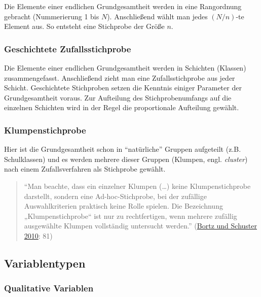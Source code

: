 \documentclass[
  11pt,
  ngerman,
  a4paper,
]{report}
\begin{document}
Die Elemente einer endlichen Grundgesamtheit werden in eine Rangordnung gebracht (Nummerierung 1 bis \(N\)). Anschließend wählt man jedes \((N/n)\)-te Element aus. So entsteht eine Stichprobe der Größe \(n\).

\hypertarget{geschichtete-zufallsstichprobe}{%
\subsubsection{Geschichtete Zufallsstichprobe}\label{geschichtete-zufallsstichprobe}}

Die Elemente einer endlichen Grundgesamtheit werden in Schichten (Klassen) zusammengefasst. Anschließend zieht man eine Zufallsstichprobe aus jeder Schicht. Geschichtete Stichproben setzen die Kenntnis einiger Parameter der Grundgesamtheit voraus. Zur Aufteilung des Stichprobenumfangs auf die einzelnen Schichten wird in der Regel die proportionale Aufteilung gewählt.

\hypertarget{klumpenstichprobe}{%
\subsubsection{Klumpenstichprobe}\label{klumpenstichprobe}}

Hier ist die Grundgesamtheit schon in \enquote{natürliche} Gruppen aufgeteilt (z.B. Schulklassen) und es werden mehrere dieser Gruppen (Klumpen, engl. \emph{cluster}) nach einem Zufallsverfahren als Stichprobe gewählt.

\begin{quote}
\enquote{Man beachte, dass ein einzelner Klumpen (\ldots) keine Klumpenstichprobe darstellt, sondern eine Ad-hoc-Stichprobe, bei der zufällige Auswahlkriterien praktisch keine Rolle spielen. Die Bezeichnung „Klumpenstichprobe`` ist nur zu rechtfertigen, wenn mehrere zufällig ausgewählte Klumpen vollständig untersucht werden.} (\protect\hyperlink{ref-bortz}{Bortz und Schuster 2010}: 81)
\end{quote}

\hypertarget{variablentypen}{%
\subsection{Variablentypen}\label{variablentypen}}

\nopagebreak

\hypertarget{qualitative-variablen}{%
\subsubsection{Qualitative Variablen}\label{qualitative-variablen}}
\end{document}
